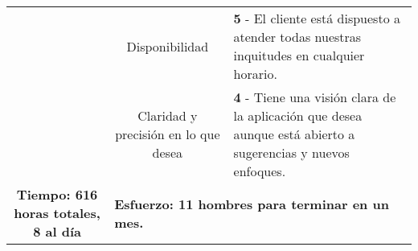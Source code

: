 \documentclass[10pt,a4paper]{article}
\begin{document}
\begin{center}
\begin{table}[t]
\begin{tabular}{|c|c|m{5cm}|}
            & Disponibilidad                        
            &
            \textbf{5} - El cliente está dispuesto a atender todas nuestras inquitudes en cualquier horario.
            \\ \cline{2-3}
            & Claridad y precisión en lo que desea  
            & 
            \textbf{4} -  Tiene una visión clara de la aplicación que desea aunque está abierto a sugerencias y nuevos 
            enfoques.
            \\ \cline{1-3}

            \textbf{Tiempo: 616 horas totales, 8 al día}
            & \multicolumn{2}{l|}{\textbf{Esfuerzo: 11 hombres para terminar en un mes.}} 
            \\ \cline{1-3}
        \end{tabular}
    \end{table}
\end{center}

    
\end{document}
